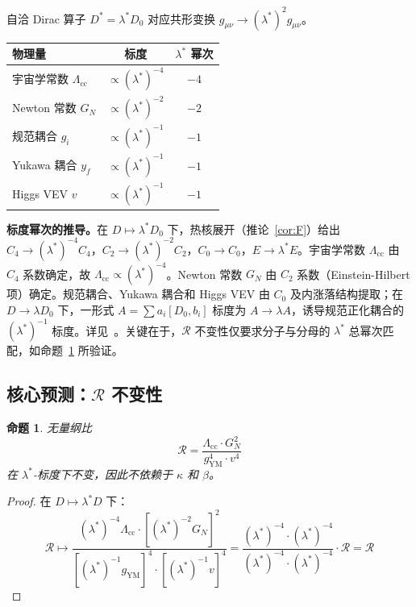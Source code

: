 \documentclass[11pt,a4paper]{ctexart}
\newtheorem{proposition}[theorem]{命题}
\theoremstyle{remark}
\newcommand{\R}{\mathcal{R}}
\newcommand{\Lcc}{\Lambda_{\mathrm{cc}}}
\newcommand{\GN}{G_N}
\newcommand{\gYM}{g_{\mathrm{YM}}}
\begin{document}
自洽 Dirac 算子 $D^* = \lambda^* D_0$ 对应共形变换 $g_{\mu\nu} \to (\lambda^*)^2 g_{\mu\nu}$。

\begin{table}[h]
\centering
\begin{tabular}{lcc}
\toprule
物理量 & 标度 & $\lambda^*$ 幂次 \\
\midrule
宇宙学常数 $\Lcc$ & $\propto (\lambda^*)^{-4}$ & $-4$ \\
Newton 常数 $\GN$ & $\propto (\lambda^*)^{-2}$ & $-2$ \\
规范耦合 $g_i$ & $\propto (\lambda^*)^{-1}$ & $-1$ \\
Yukawa 耦合 $y_f$ & $\propto (\lambda^*)^{-1}$ & $-1$ \\
Higgs VEV $v$ & $\propto (\lambda^*)^{-1}$ & $-1$ \\
\bottomrule
\end{tabular}
\end{table}

\textbf{标度幂次的推导。}在 $D \mapsto \lambda^* D_0$ 下，热核展开（推论~\ref{cor:F}）给出 $C_4 \to (\lambda^*)^{-4} C_4$，$C_2 \to (\lambda^*)^{-2} C_2$，$C_0 \to C_0$，$E \to \lambda^* E$。宇宙学常数 $\Lcc$ 由 $C_4$ 系数确定，故 $\Lcc \propto (\lambda^*)^{-4}$。Newton 常数 $\GN$ 由 $C_2$ 系数（Einstein-Hilbert 项）确定。规范耦合、Yukawa 耦合和 Higgs VEV 由 $C_0$ 及内涨落结构提取；在 $D \to \lambda D_0$ 下，一形式 $A = \sum a_i[D_0, b_i]$ 标度为 $A \to \lambda A$，诱导规范正化耦合的 $(\lambda^*)^{-1}$ 标度。详见~\cite{CCM06}。关键在于，$\R$ 不变性仅要求分子与分母的 $\lambda^*$ 总幂次匹配，如命题~\ref{prop:R} 所验证。

\subsection{核心预测：$\R$ 不变性}

\begin{proposition}
\label{prop:R}
无量纲比
\[
  \R = \frac{\Lcc \cdot \GN^2}{\gYM^4 \cdot v^4}
\]
在 $\lambda^*$-标度下不变，因此不依赖于 $\kappa$ 和 $\beta$。
\end{proposition}

\begin{proof}
在 $D \mapsto \lambda^* D$ 下：
\[
  \R \mapsto \frac{(\lambda^*)^{-4} \Lcc \cdot [(\lambda^*)^{-2} \GN]^2}{[(\lambda^*)^{-1} \gYM]^4 \cdot [(\lambda^*)^{-1} v]^4} = \frac{(\lambda^*)^{-4} \cdot (\lambda^*)^{-4}}{(\lambda^*)^{-4} \cdot (\lambda^*)^{-4}} \cdot \R = \R
\]
\end{proof}
\end{document}
